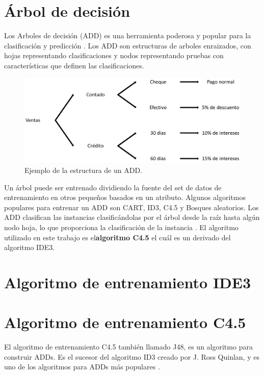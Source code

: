 \documentclass[twoside,spanish,ESP,MSc]{plantillaLabUPV}
\theoremstyle{definition}
\begin{document}
\section{Árbol de decisión}

Los Arboles de decisión (ADD) es una herramienta poderosa y popular para la clasificación y predicción \cite{cart84}. Los ADD son estructuras de arboles enraizados, con hojas representando clasificaciones y nodos representando pruebas con características que definen las clasificaciones.

\begin{figure}[h] 
	\centering 
		\includegraphics[scale=.30]{ima/add} 
	\caption{Ejemplo de la estructura de un ADD.} 
	\label{add} 
\end{figure}


Un árbol puede ser entrenado dividiendo la fuente del set de datos de entrenamiento en otros pequeños basados en un atributo. Algunos algoritmos populares para entrenar un ADD son CART, ID3, C4.5 y Bosques aleatorios.  Los ADD clasifican las instancias clasificándolas por el árbol desde la raíz hasta algún nodo hoja, lo que proporciona la clasificación de la instancia \cite{Mitchell:1997:ML:541177}. El algoritmo utilizado en este trabajo es el\textbf{algoritmo C4.5} el cuál es un derivado del algoritmo IDE3.

\section{Algoritmo de entrenamiento IDE3}

\section{Algoritmo de entrenamiento C4.5}

El algoritmo de entrenamiento C4.5 también llamado J48, es un algoritmo para construir ADDs. Es el sucesor del algoritmo ID3 creado por J. Ross Quinlan, y es uno de los algoritmos para ADDs más populares \cite{c45salz}. 
\end{document}
